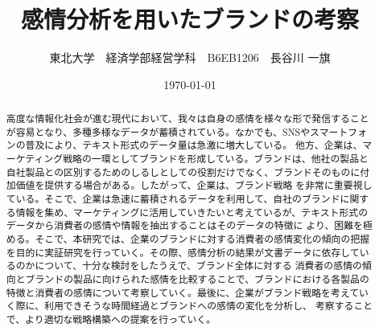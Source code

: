 \documentclass[uplatex,11pt]{jsarticle}
\title{感情分析を用いたブランドの考察}
\author{東北大学　経済学部経営学科　B6EB1206　長谷川 一旗}
\date{\today}
\begin{document}
\maketitle
\begin{abstract}
    \large
    高度な情報化社会が進む現代において、我々は自身の感情を様々な形で発信することが容易となり、多種多様なデータが蓄積されている。なかでも、SNSやスマートフォンの普及により、テキスト形式のデータ量は急激に増大している。
    他方、企業は、マーケティング戦略の一環としてブランドを形成している。ブランドは、他社の製品と自社製品との区別するためのしるしとしての役割だけでなく、ブランドそのものに付加価値を提供する場合がある。したがって、企業は、ブランド戦略
    を非常に重要視している。そこで、企業は急速に蓄積されるデータを利用して、自社のブランドに関する情報を集め、マーケティングに活用していきたいと考えているが、テキスト形式のデータから消費者の感情や情報を抽出することはそのデータの特徴に
    より、困難を極める。そこで、本研究では、企業のブランドに対する消費者の感情変化の傾向の把握を目的に実証研究を行っていく。その際、感情分析の結果が文書データに依存しているのかについて、十分な検討をしたうえで、ブランド全体に対する
    消費者の感情の傾向とブランドの製品に向けられた感情を比較することで、ブランドにおける各製品の特徴と消費者の感情について考察していく。最後に、企業がブランド戦略を考えていく際に、利用できそうな時間経過とブランドへの感情の変化を分析し、
    考察することで、より適切な戦略構築への提案を行っていく。
\end{abstract}
\newpage
\tableofcontents
\twocolumn
\end{document}

